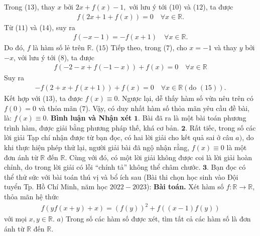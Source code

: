 \begin{multicols}{2}
	Trong ($13$), thay $x$ bởi  $2x + f\left( x \right) - 1,$ với lưu ý tới ($10$) và ($12$), ta được
	\begin{align*}
		f\left( {2x + 1 + f\left( x \right)} \right) = 0 \quad
		\forall x \in \mathbb{R}. \tag{$14$}
	\end{align*}
	Từ ($11$) và ($14$), suy ra
	\begin{align*}
		f\left( { - x - 1} \right) =  - f\left( {x + 1} \right) \quad\forall x \in \mathbb{R}. \tag{$15$}
	\end{align*}
	Do đó, $f$ là hàm số lẻ trên $\mathbb{R}$. \hfill ($15$)
	\vskip 0.05cm
	Tiếp theo, trong ($7$), cho $x = -1$ và thay $y$ bởi $-x$, với lưu ý tới ($8$), ta được
	\begin{align*}
		f\left( { - 2 - x + f\left( { - 1 - x} \right)} \right) + f\left( x \right) = 0 \quad\forall x \in \mathbb{R}
	\end{align*}
	Suy ra
	\begin{align*}
		- f\left( {2 + x + f\left( {x + 1} \right)} \right) + f\left( x \right) = 0 \quad
		\forall x \in \mathbb{R} (\text{do } (15)).
	\end{align*}
	Kết hợp với ($13$), ta được  $f(x) \equiv 0$.
	\vskip 0.05cm
	Ngược lại, dễ thấy hàm số vừa nêu trên có $f(0) = 0$  và thỏa mãn ($7$).
	\vskip 0.05cm
	Vậy, có duy nhất hàm số thỏa mãn yêu cầu đề bài, là: $f(x) \equiv 0$.
	\vskip 0.05cm  
	\textbf{\color{thachthuctoanhoc}Bình luận và Nhận xét}
	\vskip 0.05cm
	$\pmb{1.}$ Bài đã ra là một bài toán phương trình hàm, được giải bằng phương pháp thế, khá cơ bản.
	\vskip 0.05cm
	$\pmb{2.}$ Rất tiếc, trong số các lời giải Tạp chí nhận được từ bạn đọc, có hai lời giải cho kết quả sai ở câu $a)$, do khi thực hiện phép thử lại, người giải bài đã ngộ nhận rằng, $f(x) \equiv 0$  là một đơn ánh từ $\mathbb{R}$  đến  $\mathbb{R}$. Cùng với đó, có một lời giải không được coi là lời giải hoàn chỉnh, do trong lời giải có lỗi “chính tả” không thể châm chước.
	\vskip 0.05cm
	$\pmb{3.}$ Bạn đọc có thể thử sức với bài toán thú vị và bổ ích sau (Bài thi chọn học sinh vào Đội tuyển Tp. Hồ Chí Minh, năm học $2022 - 2023$):
	\vskip 0.05cm
	\textbf{\color{thachthuctoanhoc}Bài toán.} Xét hàm số  $f: \mathbb{R} \to \mathbb{R}$, thỏa mãn hệ thức
	\begin{align*}
		f\left( {yf\left( {x + y} \right) + x} \right) = {\left( {f\left( y \right)} \right)^2} + f\left( {\left( {x - 1} \right)f\left( y \right)} \right)
	\end{align*}
	với mọi  $x,y \in \mathbb{R}$.
	\vskip 0.05cm
	$a)$ Trong số các hàm số được xét, tìm tất cả các hàm số là đơn ánh từ $\mathbb{R}$ đến  $\mathbb{R}$.

\end{multicols}
